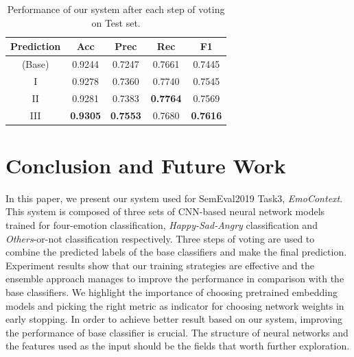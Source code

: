 \documentclass[11pt,a4paper]{article}
\begin{document}
\begin{table}\small
\begin{center}
\begin{tabular}{c|cccc}
\hline
\bf Prediction & \bf Acc & \bf Prec & \bf Rec & \bf F1 \\ 
\hline
(Base) & 0.9244 & 0.7247 & 0.7661 & 0.7445 \\
I & 0.9278 & 0.7360 & 0.7740 & 0.7545 \\
II & 0.9281 & 0.7383 & \bf 0.7764 & 0.7569 \\
III & \bf 0.9305 & \bf 0.7553 & 0.7680 & \bf 0.7616 \\
\hline
\end{tabular}
\end{center}
\caption{\label{tab:boosting_mat} Performance of our system after each step of voting on Test set.}
\end{table}

\section{Conclusion and Future Work}
\label{sec:conclusion}

In this paper, we present our system used for SemEval2019 Task3, {\em EmoContext}. This system is composed of three sets of CNN-based neural network models trained for four-emotion classification, {\em Happy-Sad-Angry} classification and {\em Others}-or-not classification respectively. Three steps of voting are used to combine the predicted labels of the base classifiers and make the final prediction. Experiment results show that our training strategies are effective and the ensemble approach manages to improve the performance in comparison with the base classifiers. We highlight the importance of choosing pretrained embedding models and picking the right metric as indicator for choosing network weights in early stopping. In order to achieve better result based on our system, improving the performance of base classifier is crucial. The structure of neural networks and the features used as the input should be the fields that worth further exploration.



\end{document}

